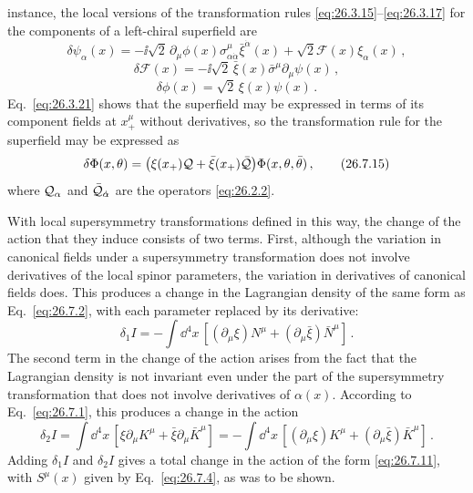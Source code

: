 instance, the local versions of the transformation rules
\eqref{eq:26.3.15}--\eqref{eq:26.3.17} for the components of a left-chiral
superfield are
\begin{equation}
  \delta\psi_\alpha(x)
  =-\ii\sqrt{2}\,\partial_\mu\phi(x)
    \sigma^\mu_{\alpha\dot\alpha}\bar\xi^{\dot\alpha}(x)
   +\sqrt{2}\mathcal{F}(x)\xi_\alpha(x)\,,
  \tag{26.7.12}\label{eq:26.7.12}
\end{equation}
\begin{equation}
  \delta\mathcal{F}(x)
  =-\ii\sqrt{2}\,
    \bar\xi(x)\bar\sigma^\mu\partial_\mu\psi(x)\,,
  \tag{26.7.13}\label{eq:26.7.13}
\end{equation}
\begin{equation}
  \delta\phi(x)
  =\sqrt{2}\,\xi(x)\psi(x)\,.
  \tag{26.7.14}\label{eq:26.7.14}
\end{equation}
Eq.~\eqref{eq:26.3.21} shows that the superfield may be expressed in terms of
its component fields at \(x_+^\mu\) without derivatives, so the
transformation rule for the superfield may be expressed as
\begin{equation}
  \delta\Phi(x,\theta)
  =\bigl(\xi(x_+)\mathcal{Q}
    +\bar\xi(x_+)\bar{\mathcal{Q}}\bigr)\Phi(x,\theta,\bar\theta)\,,
  \tag{26.7.15}\label{eq:26.7.15}
\end{equation}
where \(\mathcal{Q}_\alpha\) and \(\bar{\mathcal{Q}}_{\dot\alpha}\) are the
operators \eqref{eq:26.2.2}.

With local supersymmetry transformations defined in this way, the change of
the action that they induce consists of two terms. First, although the
variation in canonical fields under a supersymmetry transformation does not
involve derivatives of the local spinor parameters, the variation in
derivatives of canonical fields does. This produces a change in the
Lagrangian density of the same form as Eq.~\eqref{eq:26.7.2}, with each
parameter replaced by its derivative:
\[
  \delta_1 I
  =-\int \dd^4x\,
  \left[(\partial_\mu\xi)N^\mu
       +(\partial_\mu\bar\xi)\bar N^\mu\right]\,.
\]
The second term in the change of the action arises from the fact that the
Lagrangian density is not invariant even under the part of the supersymmetry
transformation that does not involve derivatives of \(\alpha(x)\). According
to Eq.~\eqref{eq:26.7.1}, this produces a change in the action
\[
  \delta_2 I
  =\int \dd^4x\,
   \left[\xi\partial_\mu K^\mu+\bar\xi\partial_\mu\bar K^\mu\right]
  =-\int \dd^4x\,
   \left[(\partial_\mu\xi)K^\mu
        +(\partial_\mu\bar\xi)\bar K^\mu\right]\,.
\]
Adding \(\delta_1 I\) and \(\delta_2 I\) gives a total change in the action of
the form \eqref{eq:26.7.11}, with \(S^\mu(x)\) given by
Eq.~\eqref{eq:26.7.4}, as was to be shown.

